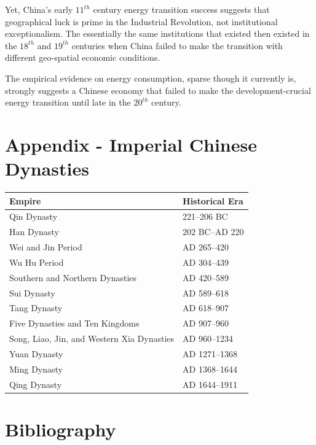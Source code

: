 \documentclass[12pt]{article}
\numberwithin{equation}{section}
\begin{document}
	Yet, China's early $11^{th}$ century energy transition success suggests that geographical luck is prime in the Industrial Revolution, not institutional exceptionalism. The essentially the same institutions that existed then existed in the $18^{th}$ and $19^{th}$ centuries when China failed to make the transition with different geo-spatial economic conditions.
	
	The empirical evidence on energy consumption, sparse though it currently is, strongly suggests a Chinese economy that failed to make the development-crucial energy transition until late in the $20^{th}$ century.
	
	\section{Appendix - Imperial Chinese Dynasties}
	
	\begin{tabular}{ll}
	Empire&Historical Era\\
	\hline \hline
	Qin Dynasty &221--206 BC\\
	Han Dynasty &202 BC--AD 220\\
	Wei and Jin Period &AD 265--420\\
	Wu Hu Period &AD 304--439\\
	Southern and Northern Dynasties &AD 420--589\\
	Sui Dynasty &AD 589--618\\
	Tang Dynasty &AD 618--907\\
	Five Dynasties and Ten Kingdoms &AD 907--960\\
	Song, Liao, Jin, and Western Xia Dynasties &AD 960--1234\\
	Yuan Dynasty &AD 1271--1368\\
	Ming Dynasty &AD 1368--1644\\
	Qing Dynasty &AD 1644--1911\\
	\hline
	\end{tabular}
	
	\newpage
	\section{Bibliography}
%	
		
		
\end{document}
